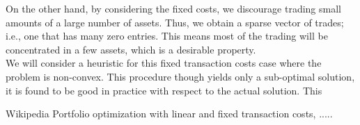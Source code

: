 \documentclass[a4paper]{article}
\begin{document}
On the other hand, by considering the fixed costs, we discourage trading small amounts
of a large number of assets. Thus, we obtain a sparse vector of trades; i.e., one that has many
zero entries. This means most of the trading will be concentrated in a few assets, which is a
desirable property.\\[0.2em]

We will consider a heuristic for this fixed transaction costs case where the problem is non-convex. This procedure though yields only a sub-optimal solution, it is found to be good in practice with respect to the actual solution. This 





\begin{thebibliography}{10}

 Wikipedia
 Portfolio optimization with linear and fixed transaction costs, .....
\end{thebibliography}
\end{document}
